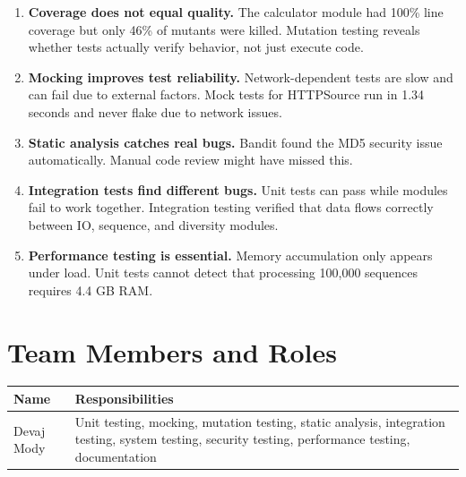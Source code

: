 \documentclass[11pt]{article}
\begin{document}
\begin{enumerate}
    \item \textbf{Coverage does not equal quality.} The calculator module had 100\% line coverage but only 46\% of mutants were killed. Mutation testing reveals whether tests actually verify behavior, not just execute code.

    \item \textbf{Mocking improves test reliability.} Network-dependent tests are slow and can fail due to external factors. Mock tests for HTTPSource run in 1.34 seconds and never flake due to network issues.

    \item \textbf{Static analysis catches real bugs.} Bandit found the MD5 security issue automatically. Manual code review might have missed this.

    \item \textbf{Integration tests find different bugs.} Unit tests can pass while modules fail to work together. Integration testing verified that data flows correctly between IO, sequence, and diversity modules.

    \item \textbf{Performance testing is essential.} Memory accumulation only appears under load. Unit tests cannot detect that processing 100,000 sequences requires 4.4 GB RAM.
\end{enumerate}

\section{Team Members and Roles}

\begin{table}[h]
\centering
\begin{tabular}{lp{10cm}}
\toprule
\textbf{Name} & \textbf{Responsibilities} \\
\midrule
Devaj Mody & Unit testing, mocking, mutation testing, static analysis, integration testing, system testing, security testing, performance testing, documentation \\
\bottomrule
\end{tabular}
\end{table}
\end{document}
